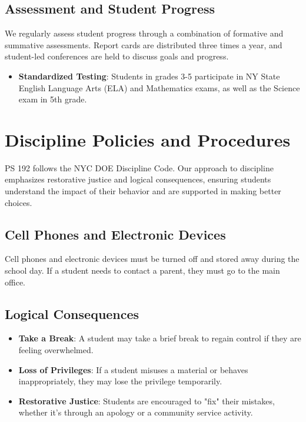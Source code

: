 \documentclass[11pt]{article}
\begin{document}
\subsection{Assessment and Student Progress}
\label{sec:org2e9802e}
We regularly assess student progress through a combination of formative and summative assessments. Report cards are distributed three times a year, and student-led conferences are held to discuss goals and progress.

\begin{itemize}
\item \textbf{\textbf{Standardized Testing}}: Students in grades 3-5 participate in NY State English Language Arts (ELA) and Mathematics exams, as well as the Science exam in 5th grade.
\end{itemize}

\section{Discipline Policies and Procedures}
\label{sec:org759be53}
PS 192 follows the NYC DOE Discipline Code. Our approach to discipline emphasizes restorative justice and logical consequences, ensuring students understand the impact of their behavior and are supported in making better choices.

\subsection{Cell Phones and Electronic Devices}
\label{sec:org9ab75f5}
Cell phones and electronic devices must be turned off and stored away during the school day. If a student needs to contact a parent, they must go to the main office.

\subsection{Logical Consequences}
\label{sec:org0e93269}
\begin{itemize}
\item \textbf{\textbf{Take a Break}}: A student may take a brief break to regain control if they are feeling overwhelmed.
\item \textbf{\textbf{Loss of Privileges}}: If a student misuses a material or behaves inappropriately, they may lose the privilege temporarily.
\item \textbf{\textbf{Restorative Justice}}: Students are encouraged to "fix" their mistakes, whether it’s through an apology or a community service activity.
\end{itemize}
\end{document}
